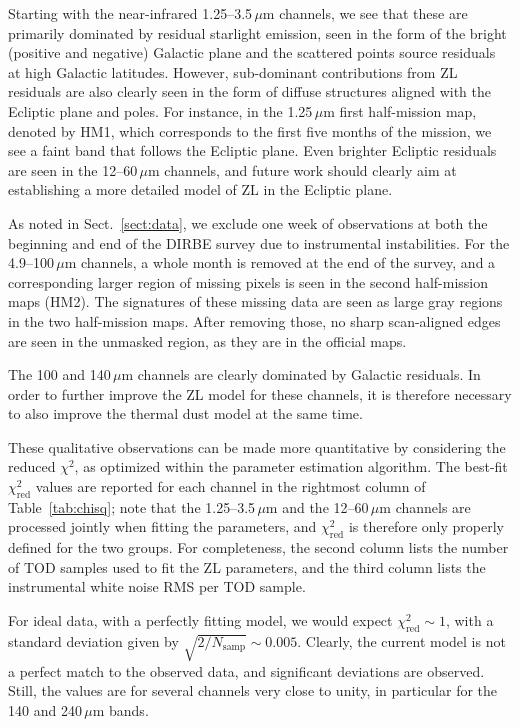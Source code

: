 \documentclass[twocolumn]{aa}
\def\IRAS{\textit{IRAS}}
\def\AKARI{\textit{AKARI}}
\begin{document}
Starting with the near-infrared 1.25--3.5\,$\mu$m channels, we see
that these are primarily dominated by residual starlight emission,
seen in the form of the bright (positive and negative) Galactic plane
and the scattered points source residuals at high Galactic
latitudes. However, sub-dominant contributions from ZL residuals are
also clearly seen in the form of diffuse structures aligned with the
Ecliptic plane and poles. For instance, in the 1.25\,$\mu$m first
half-mission map, denoted by HM1, which corresponds to the first five
months of the mission, we see a faint band that follows the Ecliptic
plane. Even brighter Ecliptic residuals are seen in the 12--60\,$\mu$m
channels, and future work should clearly aim at establishing a more
detailed model of ZL in the Ecliptic plane.

As noted in Sect.~\ref{sect:data}, we exclude one week of observations
at both the beginning and end of the DIRBE survey due to instrumental
instabilities. For the 4.9--100$\,\mu$m channels, a whole month is
removed at the end of the survey, and a corresponding larger region of
missing pixels is seen in the second half-mission maps (HM2). The signatures of these missing data
are seen as large gray regions in the two half-mission maps. After
removing those, no sharp scan-aligned edges are seen in the unmasked
region, as they are in the official maps.

The 100 and 140$\,\mu$m channels are clearly dominated by Galactic
residuals. In order to further improve the ZL model for these channels, it is therefore necessary to also improve the thermal dust model at the same time.  

These qualitative observations can be made more quantitative by
considering the reduced $\chi^2$, as optimized within the parameter
estimation algorithm. The best-fit $\chi^2_{\mathrm{red}}$ values are
reported for each channel in the rightmost column of
Table~\ref{tab:chisq}; note that the 1.25--3.5$\,\mu$m and the 12--60$\,\mu$m channels are
processed jointly when fitting the parameters, and
$\chi^2_{\mathrm{red}}$ is therefore only properly defined for the two groups. 
For completeness, the second column lists the number of
TOD samples used to fit the ZL parameters, and the third column lists
the instrumental white noise RMS per TOD sample.

For ideal data, with a perfectly fitting model, we would
expect $\chi^2_{\mathrm{red}}\sim 1$, with a standard deviation given
by $\sqrt{2/N_{\mathrm{samp}}}\sim0.005$. Clearly, the current model
is not a perfect match to the observed data, and significant
deviations are observed. Still, the values are for several channels
very close to unity, in particular for the 140 and 240$\,\mu$m bands.
\end{document}
